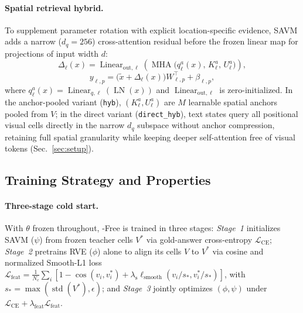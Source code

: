 \paragraph{Spatial retrieval hybrid.}
To supplement parameter rotation with explicit location-specific evidence, SAVM
adds a narrow ($d_q{=}256$) cross-attention residual before the frozen linear map
for projections of input width $d$:
\begin{equation}
\Delta_\ell(x)=\operatorname{Linear}_{\mathrm{out},\ell}\!\left(
\operatorname{MHA}\bigl(q_\ell^a(x),\,K_\ell^a,\,U_\ell^a\bigr)
\right),
\label{eq:hyb}
\end{equation}
\begin{equation}
y_{\ell,p}=\bigl(\widetilde{x}+\Delta_\ell(x)\bigr)W_{\ell,p}^\top+\beta_{\ell,p},
\label{eq:hybrid_projection}
\end{equation}
where $q_\ell^a(x)=\operatorname{Linear}_{q,\ell}(\operatorname{LN}(x))$ and
$\operatorname{Linear}_{\mathrm{out},\ell}$ is zero-initialized. In the
anchor-pooled variant (\texttt{hyb}), $(K_\ell^a,U_\ell^a)$ are $M$ learnable
spatial anchors pooled from $V$; in the direct variant (\texttt{direct\_hyb}),
text states query all positional visual cells directly in the narrow $d_q$
subspace without anchor compression, retaining full spatial granularity while
keeping deeper self-attention free of visual tokens (Sec.~\ref{sec:setup}).

\subsection{Training Strategy and Properties}
\label{sec:opd}

\paragraph{Three-stage cold start.}
With $\theta$ frozen throughout, \modelname-Free is trained in three stages:
\emph{Stage~1} initializes SAVM ($\psi$) from frozen teacher cells $V^\ast$ via
gold-answer cross-entropy $\mathcal{L}_{\mathrm{CE}}$; \emph{Stage~2} pretrains
RVE ($\phi$) alone to align its cells $V$ to $V^\ast$ via cosine and normalized
Smooth-L1 loss $\mathcal{L}_{\mathrm{feat}}
=\frac{1}{N_c}\sum_i[1-\cos(v_i,v_i^\ast)+\lambda_{\mathrm{s}}\ell_{\mathrm{smooth}}(v_i/s_\ast,v_i^\ast/s_\ast)]$,
with $s_\ast{=}\max(\operatorname{std}(V^\ast),\epsilon)$; and \emph{Stage~3}
jointly optimizes $(\phi,\psi)$ under $\mathcal{L}_{\mathrm{CE}}+\lambda_{\mathrm{feat}}\mathcal{L}_{\mathrm{feat}}$.

